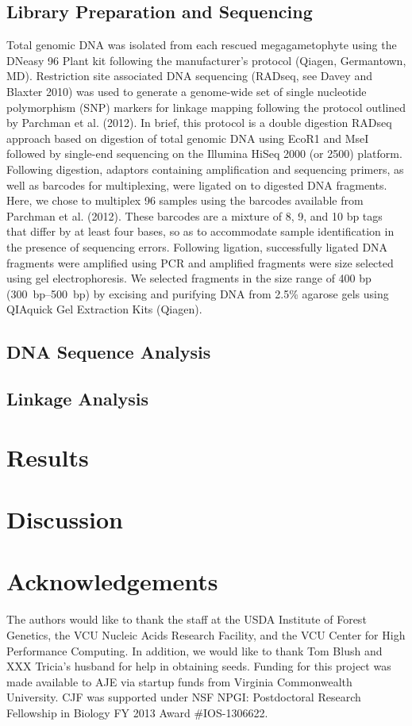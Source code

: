 \documentclass[11pt]{article}
\begin{document}
\subsection{Library Preparation and Sequencing}

Total genomic DNA was isolated from each rescued megagametophyte using the DNeasy 96 Plant 
kit following the manufacturer’s protocol (Qiagen, Germantown, MD). Restriction site associated DNA 
sequencing (RADseq, see Davey and Blaxter 2010) was used to generate a genome-wide set of 
single nucleotide polymorphism (SNP) markers for linkage mapping following the protocol 
outlined by Parchman et al. (2012). In brief, this protocol is a double digestion RADseq 
approach based on digestion of total genomic DNA using EcoR1 and MseI followed by single-end 
sequencing on the Illumina HiSeq 2000 (or 2500) platform. Following digestion, adaptors 
containing amplification and sequencing primers, as well as barcodes for multiplexing, 
were ligated on to digested DNA fragments. Here, we chose to multiplex 96 samples using the 
barcodes available from Parchman et al. (2012). These barcodes are a mixture of 8, 9, and 
10 bp tags that differ by at least four bases, so as to accommodate sample identification in the 
presence of sequencing errors. Following ligation, successfully ligated DNA fragments were 
amplified using PCR and amplified fragments were size selected using gel electrophoresis. We selected 
fragments in the size range of 400 bp (\SIrange{300}{500}{bp}) by excising and purifying DNA from 2.5\% 
agarose gels using QIAquick Gel Extraction Kits (Qiagen).


\subsection{DNA Sequence Analysis}

\subsection{Linkage Analysis}

\section{Results}

\section{Discussion}

\section{Acknowledgements}

The authors would like to thank the staff at the USDA Institute of Forest Genetics, the 
VCU Nucleic Acids Research Facility, and the VCU Center for High Performance Computing. 
In addition, we would like to thank Tom Blush and XXX Tricia’s husband for help in obtaining 
seeds. Funding for this project was made available to AJE via startup funds from Virginia 
Commonwealth University. CJF was supported under NSF NPGI: Postdoctoral Research Fellowship 
in Biology FY 2013 Award \#IOS-1306622.
\end{document}
